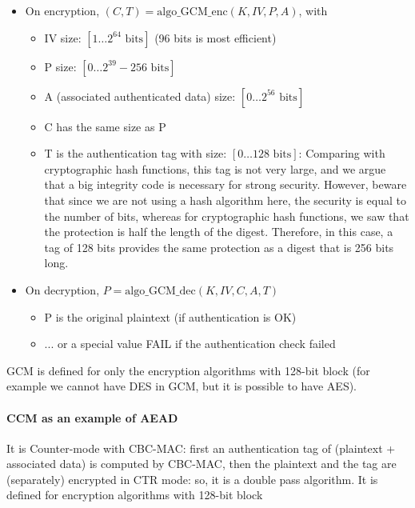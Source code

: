 \begin{itemize}
	\item On encryption, $(C, T) = \text{algo\_GCM\_enc}(K, IV, P, A)$, with
	      \begin{itemize}
		      \item IV size: $[1 \ldots 2^{64} \text{ bits}]$ (96 bits is most efficient)
		      \item P size: $[0 \ldots 2^{39} - 256 \text{ bits}]$
		      \item A (associated authenticated data) size: $[0 \ldots 2^{56} \text{ bits}]$
		      \item C has the same size as P
		      \item T is the authentication tag with size: $[0 \ldots 128 \text{ bits}]$: Comparing with cryptographic hash functions, this tag is not very large, and we argue that a big integrity code is necessary for strong security. However, beware that since we are not using a hash algorithm here, the security is equal to the number of bits, whereas for cryptographic hash functions, we saw that the protection is half the length of the digest. Therefore, in this case, a tag of 128 bits provides the same protection as a digest that is 256 bits long.

	      \end{itemize}
	\item On decryption, $P = \text{algo\_GCM\_dec}(K, IV, C, A, T)$
	      \begin{itemize}
		      \item P is the original plaintext (if authentication is OK)
		      \item ... or a special value FAIL if the authentication check failed
	      \end{itemize}
\end{itemize}

GCM is defined for only the encryption algorithms with 128-bit block (for example we cannot have DES in
GCM, but it is possible to have AES).

\paragraph{CCM as an example of AEAD}
It is Counter-mode with CBC-MAC: first an authentication tag of (plaintext + associated data) is computed
by CBC-MAC, then the plaintext and the tag are (separately) encrypted in CTR mode: so, it is a double pass
algorithm. It is defined for encryption algorithms with 128-bit block


